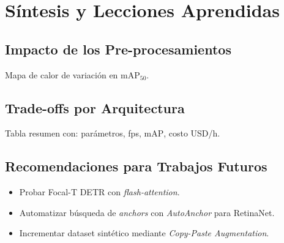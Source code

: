 \section{Síntesis y Lecciones Aprendidas}\label{sec:sintesis}
\subsection{Impacto de los Pre-procesamientos}
Mapa de calor de variación en \(\text{mAP}_{50}\).

\subsection{Trade-offs por Arquitectura}
Tabla resumen con:
parámetros, fps, \(\text{mAP}\), costo USD/h.

\subsection{Recomendaciones para Trabajos Futuros}
\begin{itemize}
    \item Probar Focal-T DETR con \emph{flash-attention}.
    \item Automatizar búsqueda de \emph{anchors} con
          \emph{AutoAnchor} para RetinaNet.
    \item Incrementar dataset sintético mediante
          \emph{Copy-Paste Augmentation}.
\end{itemize}
